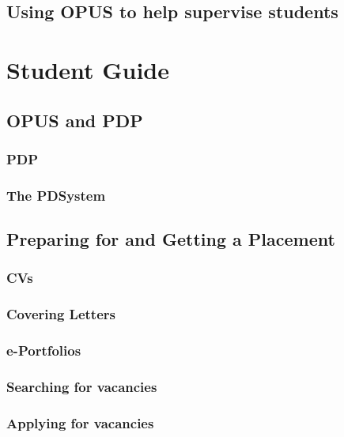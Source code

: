 \documentclass[12 pt]{book}
\begin{document}
\chapter{Using OPUS to help supervise students}

\part{Student Guide}

%
%
%

\chapter{OPUS and PDP}

\section{PDP}

\section{The PDSystem}

%
%
%

\chapter{Preparing for and Getting a Placement}

\section{CVs}

\section{Covering Letters}

\section{e-Portfolios}

\section{Searching for vacancies}

\section{Applying for vacancies}
\end{document}
